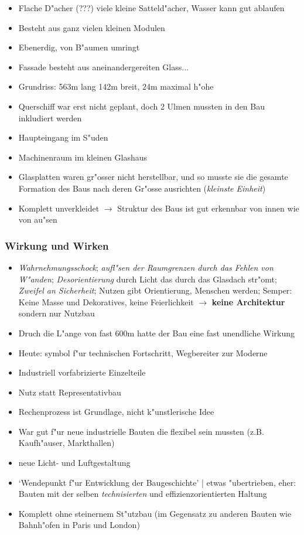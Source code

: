 \documentclass[]{scrartcl}
\begin{document}
\begin{itemize}
  \item Flache D"acher (???) viele kleine Satteld"acher, Wasser kann gut ablaufen
  \item Besteht aus ganz vielen kleinen Modulen
  \item Ebenerdig, von B"aumen umringt
  \item Fassade besteht aus aneinandergereiten Glass...
  \item Grundriss: 563m lang 142m breit, 24m maximal h"ohe
  \item Querschiff war erst nicht geplant, doch 2 Ulmen mussten in den Bau inkludiert werden
  \item Haupteingang im S"uden
  \item Machinenraum im kleinen Glashaus
  \item Glasplatten waren gr"osser nicht herstellbar, und so musste sie die gesamte Formation des Baus nach deren Gr"osse ausrichten (\emph{kleinste Einheit})
  \item Komplett unverkleidet $\rightarrow$ Struktur des Baus ist gut erkennbar von innen wie von au"sen
\end{itemize}

\subsubsection{Wirkung und Wirken}
\begin{itemize}
  \item \emph{Wahrnehmungsschock}; \emph{aufl"sen der Raumgrenzen durch das Fehlen von W"anden}; \emph{Desorientierung} durch Licht das durch das Glasdach str"omt; \emph{Zweifel an Sicherheit}; Nutzen gibt Orientierung, Menschen werden; Semper: Keine Masse und Dekoratives, keine Feierlichkeit $\rightarrow$ \textbf{keine Architektur} sondern nur Nutzbau
  \item Druch die L"ange von fast 600m hatte der Bau eine fast unendliche Wirkung 
  \item Heute: symbol f"ur technischen Fortschritt, Wegbereiter zur Moderne
  \item Industriell vorfabrizierte Einzelteile
  \item Nutz statt Representativbau
  \item Rechenprozess ist Grundlage, nicht k"unstlerische Idee
  \item War gut f"ur neue industrielle Bauten die flexibel sein mussten (z.B. Kaufh"auser, Markthallen)
  \item neue Licht- und Luftgestaltung
  \item `Wendepunkt f"ur Entwicklung der Baugeschichte' | etwas "ubertrieben, eher: Bauten mit der selben \emph{technisierten} und effizienzorientierten Haltung
  \item Komplett ohne steinernem St"utzbau (im Gegensatz zu anderen Bauten wie Bahnh"ofen in Paris und London)
\end{itemize}
\end{document}
